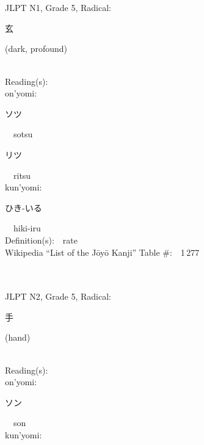 \begin{multicols}{2}
\ \ \\
{\fontsize{34pt}{40pt}  }\ \ \\  %
{JLPT N1, Grade 5, Radical:\ \ {\begin{CJK}{UTF8}{min} 玄 \end{CJK}} (dark, profound) } \\
Reading(s):\ \ \\
{\hspace*{1em}}on'yomi:\ \ \\
{\hspace*{2em}}{\begin{CJK}{UTF8}{min} ソツ \end{CJK}}\ \ sotsu\ \ \\
{\hspace*{2em}}{\begin{CJK}{UTF8}{min} リツ \end{CJK}}\ \ ritsu\ \ \\
{\hspace*{1em}}kun'yomi:\ \ \\
{\hspace*{2em}}{\begin{CJK}{UTF8}{min} ひき-いる \end{CJK}}\ \ hiki-iru\ \ \\
Definition(s):\ \ rate \\
Wikipedia ``List of the J\=oy\=o Kanji'' Table \#:\ \ 1\,277 \\
\ \ \\
{\fontsize{34pt}{40pt}  }\ \ \\  %
{JLPT N2, Grade 5, Radical:\ \ {\begin{CJK}{UTF8}{min} 手 \end{CJK}} (hand) } \\
Reading(s):\ \ \\
{\hspace*{1em}}on'yomi:\ \ \\
{\hspace*{2em}}{\begin{CJK}{UTF8}{min} ソン \end{CJK}}\ \ son\ \ \\
{\hspace*{1em}}kun'yomi:\ \ \\

\end{multicols}

